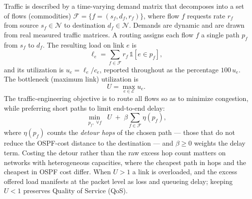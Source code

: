 Traffic is described by a time-varying demand matrix that decomposes into a set
of flows (commodities)
$\mathcal{F}=\{f=(s_f,d_f,r_f)\}$, where flow $f$ requests rate $r_f$ from
source $s_f\in\mathcal{N}$ to destination $d_f\in\mathcal{N}$. Demands are
dynamic and are drawn from real measured traffic matrices. A routing assigns
each flow $f$ a single path $p_f$ from $s_f$ to $d_f$. The resulting load on
link $e$ is
\begin{equation}\label{eq:load}
\ell_e=\sum_{f\in\mathcal{F}} r_f\,\mathbb{1}\!\left[e\in p_f\right],
\end{equation}
and its utilization is $u_e=\ell_e/c_e$, reported throughout as the percentage
$100\,u_e$. The bottleneck (maximum link) utilization is
\begin{equation}\label{eq:bottleneck}
U=\max_{e\in\mathcal{E}} u_e .
\end{equation}
The traffic-engineering objective is to route all flows so as to minimize
congestion, while preferring short paths to limit end-to-end delay:
\begin{equation}\label{eq:objective}
\min_{\,p_f,\;\forall f}\;\; U \;+\; \beta \sum_{f\in\mathcal{F}} \eta(p_f),
\end{equation}
where $\eta(p_f)$ counts the \emph{detour hops} of the chosen path --- those that
do not reduce the OSPF-cost distance to the destination --- and $\beta\ge0$
weights the delay term. Costing the detour rather than the raw excess hop count
matters on networks with heterogeneous capacities, where the cheapest path in
hops and the cheapest in OSPF cost differ. When $U>1$ a link is overloaded, and the excess offered load manifests at
the packet level as loss and queueing delay; keeping $U<1$ preserves Quality of
Service (QoS).

